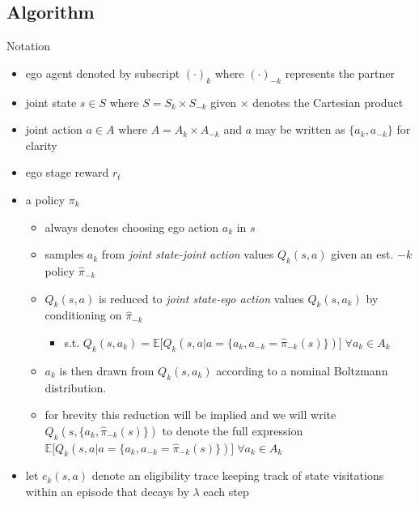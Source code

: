 \documentclass[aspectratio=1610, xcolor=dvipsnames]{packages/beamer}
\newcommand{\joint}[1]{#1}
\begin{document}
\subsection{Algorithm}

\begin{frame}{Notation}
\begin{itemize}
    \item ego agent denoted by subscript $(\cdot)_k$ where $(\cdot)_{-k}$ represents the partner
    \item joint state $\joint{s} \in \joint{S}$ where $ \joint{S} = S_{k} \times S_{-k}$ given $\times$ denotes the Cartesian product
    \item joint action $\joint{a} \in \joint{A}$ where $ \joint{A} = A_{k} \times A_{-k}$ and $\joint{a}$ may be written as $\{a_k,a_{-k}\}$ for clarity
    \item ego stage reward $r_t$
    \item a policy $\pi_k$
    \begin{itemize}
        \item always denotes choosing ego action $a_k$ in $\joint{s}$
        \item samples $a_k$ from \textit{joint state-joint action} values $Q_k(\joint{s},\joint{a})$ given an est. $-k$ policy $\hat{\pi}_{-k}$
        \item $Q_k(\joint{s},\joint{a})$ is reduced to \textit{joint state-ego action} values $Q_k(\joint{s},a_k)$ by conditioning on $\hat{\pi}_{-k}$
        \begin{itemize}
            \item[]  s.t. $Q_k(\joint{s},a_k) = \mathbb{E}\big[Q_k(\joint{s},\joint{a} | \joint{a} = \{a_k,a_{-k}=\hat{\pi}_{-k}(\joint{s})\})\big]\; \forall a_k \in A_k$
        \end{itemize}
        \item $a_k$ is then drawn from $Q_k(\joint{s},a_k)$ according to a nominal Boltzmann distribution.
        \item for brevity this reduction will be implied and we will write $Q_k(\joint{s},\{a_k,\hat{\pi}_{-k}(\joint{s})\})$ to denote the full expression
        $\mathbb{E}\big[Q_k(\joint{s},\joint{a} | \joint{a} = \{a_k,a_{-k}=\hat{\pi}_{-k}(\joint{s})\})\big]\; \forall a_k \in A_k$
    \end{itemize}
   \item let $e_k(\joint{s},\joint{a})$ denote an eligibility trace keeping track of state visitations within an episode that decays by $\lambda$ each step

\end{itemize}

\end{frame}
\end{document}
